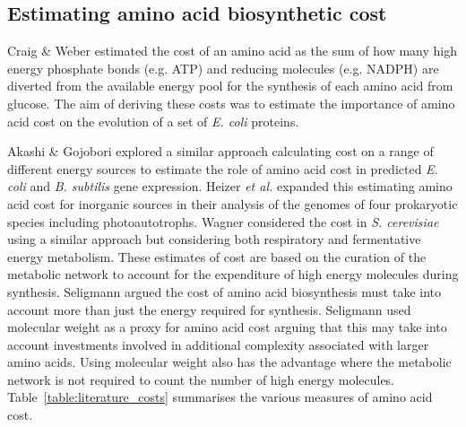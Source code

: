 \subsection{Estimating amino acid biosynthetic cost}

Craig \& Weber \cite{craig1998} estimated the cost of an amino acid as the sum of how many high energy phosphate bonds (e.g. ATP) and reducing molecules (e.g. NADPH) are diverted from the available energy pool for the synthesis of each amino acid from glucose. The aim of deriving these costs was to estimate the importance of amino acid cost on the evolution of a set of \emph{E. coli} proteins.

Akashi \& Gojobori \cite{akashi2002} explored a similar approach calculating cost on a range of different energy sources to estimate the role of amino acid cost in predicted \emph{E. coli} and \emph{B. subtilis} gene expression. Heizer \emph{et al.} \cite{heizer2006} expanded this estimating amino acid cost for inorganic sources in their analysis of the genomes of four prokaryotic species including photoautotrophs. Wagner considered the cost in \emph{S. cerevisiae} using a similar approach but considering both respiratory and fermentative energy metabolism. These estimates of cost are based on the curation of the metabolic network to account for the expenditure of high energy molecules during synthesis. Seligmann argued \cite{seligmann2003} the cost of amino acid biosynthesis must take into account more than just the energy required for synthesis. Seligmann used molecular weight as a proxy for amino acid cost arguing that this may take into account investments involved in additional complexity associated with larger amino acids. Using molecular weight also has the advantage where the metabolic network is not required to count the number of high energy molecules. Table~\ref{table:literature_costs} summarises the various measures of amino acid cost.


